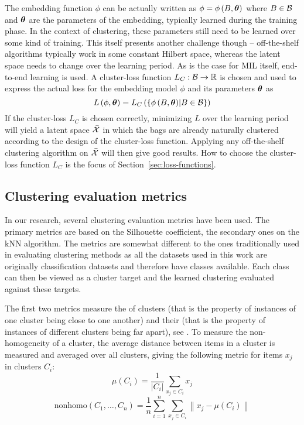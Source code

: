 The embedding function \( \phi \) can be actually written as \( \phi = \phi \left( B, \bm{\theta} \right) \) where \( B \in \mathcal{B} \) and \( \bm{\theta} \) are the parameters of the embedding, typically learned during the training phase. In the context of clustering, these parameters still need to be learned over some kind of training. This itself presents another challenge though -- off-the-shelf algorithms typically work in some constant Hilbert space, whereas the latent space needs to change over the learning period. As is the case for MIL itself, end-to-end learning is used. A cluster-loss function \( L_C: \mathcal{B} \to \mathbb{R} \) is chosen and used to express the actual loss for the embedding model \( \phi \) and its parameters \( \bm{\theta} \) as
\[ L \left( \phi, \bm{\theta} \right) = L_C \left( \left\{ \phi \left( B, \bm{\theta} \right) \middle| B \in \mathcal{B} \right\} \right) \]
If the cluster-loss \( L_C \) is chosen correctly, minimizing \( L \) over the learning period will yield a latent space \( \bar{\mathcal{X}} \) in which the bags are already naturally clustered according to the design of the cluster-loss function. Applying any off-the-shelf clustering algorithm on \( \bar{\mathcal{X}} \) will then give good results. How to choose the cluster-loss function \( L_C \) is the focus of Section~\ref{sec:loss-functions}.

\subsection{Clustering evaluation metrics}\label{sec:clustering-metrics}
In our research, several clustering evaluation metrics have been used. The primary metrics are based on the Silhouette coefficient, the secondary ones on the kNN algorithm. The metrics are somewhat different to the ones traditionally used in evaluating clustering methods as all the datasets used in this work are originally classification datasets and therefore have classes available. Each class can then be viewed as a cluster target and the learned clustering evaluated against these targets.

The first two metrics measure the  of clusters (that is the property of instances of one cluster being close to one another) and their  (that is the property of instances of different clusters being far apart), see \cite{everitt_cluster_2001}. To measure the non-homogeneity of a cluster, the average distance between items in a cluster is measured and averaged over all clusters, giving the following metric for items \( x_j \) in clusters \( C_i \):
\[ \mu \left( C_i \right) = \frac{1}{\left\lvert C_i \right\rvert} \sum_{x_j \in C_i} x_j \]
\[ \mathrm{nonhomo} \left( C_1, \dots, C_n \right) = \frac{1}{n} \sum_{i = 1}^n \sum_{x_j \in C_i} \left\lVert x_j - \mu \left( C_i \right) \right\rVert \]

